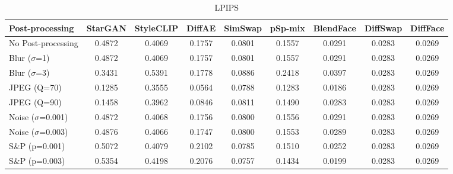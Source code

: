 \documentclass{article}
\begin{document}
\begin{table}[h!]
\begin{subtable}{\textwidth}
\caption{LPIPS}
\centering
\scriptsize
\begin{tabular}{lcccccccc}
\toprule
\textbf{Post-processing} & StarGAN & StyleCLIP & DiffAE & SimSwap & pSp-mix & BlendFace & DiffSwap & DiffFace \\
\midrule
No Post-processing & 0.4872 & 0.4069 & 0.1757 & 0.0801 & 0.1557 & 0.0291 & 0.0283 & 0.0269 \\
\midrule
Blur ($\sigma$=1) & 0.4872 & 0.4069 & 0.1757 & 0.0801 & 0.1557 & 0.0291 & 0.0283 & 0.0269 \\
Blur ($\sigma$=3) & 0.3431 & 0.5391 & 0.1778 & 0.0886 & 0.2418 & 0.0397 & 0.0283 & 0.0269 \\
JPEG (Q=70) & 0.1285 & 0.3555 & 0.0564 & 0.0788 & 0.1283 & 0.0186 & 0.0283 & 0.0269 \\
JPEG (Q=90) & 0.1458 & 0.3962 & 0.0846 & 0.0811 & 0.1490 & 0.0283 & 0.0283 & 0.0269 \\
Noise ($\sigma$=0.001) & 0.4872 & 0.4068 & 0.1756 & 0.0800 & 0.1556 & 0.0291 & 0.0283 & 0.0269 \\
Noise ($\sigma$=0.003) & 0.4876 & 0.4066 & 0.1747 & 0.0800 & 0.1553 & 0.0289 & 0.0283 & 0.0269 \\
S\&P (p=0.001) & 0.5072 & 0.4079 & 0.2102 & 0.0785 & 0.1510 & 0.0252 & 0.0283 & 0.0269 \\
S\&P (p=0.003) & 0.5354 & 0.4198 & 0.2076 & 0.0757 & 0.1434 & 0.0199 & 0.0283 & 0.0269 \\
\bottomrule
\end{tabular}
\end{subtable}


\end{table}
\end{document}
